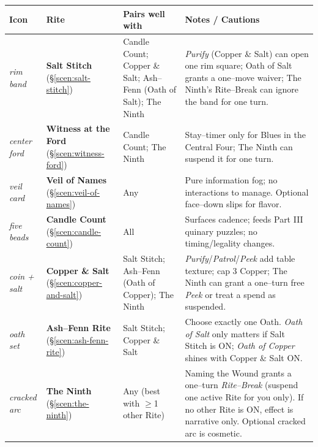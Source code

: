 \documentclass[11pt]{article}
\numberwithin{equation}{section} %
\theoremstyle{plain} %
\theoremstyle{definition} %
\theoremstyle{remark} %
\renewcommand{\arraystretch}{1.15}
\begin{document}
\medskip
\renewcommand{\arraystretch}{1.18}
\begin{tabular}{p{2.2cm} p{3.8cm} p{6.6cm} p{4.2cm}}
\toprule
\textbf{Icon} & \textbf{Rite} & \textbf{Pairs well with} & \textbf{Notes / Cautions}\\
\midrule
\textit{rim band} %
& \textbf{Salt Stitch} (\S\ref{scen:salt-stitch})
& Candle Count; Copper \& Salt; Ash--Fenn (Oath of Salt); The Ninth
& \emph{Purify} (Copper \& Salt) can open one rim square; Oath of Salt grants a one--move waiver; The Ninth's Rite--Break can ignore the band for one turn.\\

\textit{center ford} %
& \textbf{Witness at the Ford} (\S\ref{scen:witness-ford})
& Candle Count; The Ninth
& Stay--timer only for Blues in the Central Four; The Ninth can suspend it for one turn.\\

\textit{veil card} %
& \textbf{Veil of Names} (\S\ref{scen:veil-of-names})
& Any
& Pure information fog; no interactions to manage. Optional face--down slips for flavor.\\

\textit{five beads} %
& \textbf{Candle Count} (\S\ref{scen:candle-count})
& All
& Surfaces cadence; feeds Part III quinary puzzles; no timing/legality changes.\\

\textit{coin + salt} %
& \textbf{Copper \& Salt} (\S\ref{scen:copper-and-salt})
& Salt Stitch; Ash--Fenn (Oath of Copper); The Ninth
& \emph{Purify}/\emph{Patrol}/\emph{Peek} add table texture; cap 3 Copper; The Ninth can grant a one--turn free \emph{Peek} or treat a spend as suspended.\\

\textit{oath set} %
& \textbf{Ash--Fenn Rite} (\S\ref{scen:ash-fenn-rite})
& Salt Stitch; Copper \& Salt
& Choose exactly one Oath. \emph{Oath of Salt} only matters if Salt Stitch is \textsc{ON}; \emph{Oath of Copper} shines with Copper \& Salt \textsc{ON}.\\

\textit{cracked arc} %
& \textbf{The Ninth} (\S\ref{scen:the-ninth})
& Any (best with $\geq$1 other Rite)
& Naming the Wound grants a one--turn \emph{Rite--Break} (suspend one active Rite for you only). If no other Rite is \textsc{ON}, effect is narrative only. Optional cracked arc is cosmetic.\\
\bottomrule
\end{tabular}
\end{document}
